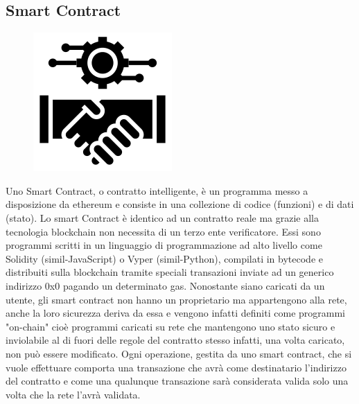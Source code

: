 \documentclass[11pt,a4paper,titlepage]{report}
\begin{document}
\subsection{Smart Contract}
\begin{figure}
	\includegraphics[height=0.2\textheight]{SmartC}
	\centering
\end{figure}

Uno Smart Contract, o contratto intelligente, è un programma messo a disposizione da ethereum e consiste in una collezione di codice (funzioni) e di dati (stato). Lo smart Contract è identico ad un contratto reale ma grazie alla tecnologia blockchain non necessita di un terzo ente verificatore. Essi sono programmi scritti in un linguaggio di programmazione ad alto livello come Solidity (simil-JavaScript) o Vyper (simil-Python), compilati in bytecode e distribuiti sulla blockchain tramite speciali transazioni inviate ad un generico indirizzo 0x0 pagando un determinato gas. Nonostante siano caricati da un utente, gli smart contract non hanno un proprietario ma appartengono alla rete, anche la loro sicurezza deriva da essa e vengono infatti definiti come programmi "on-chain" cioè programmi caricati su rete che mantengono uno stato sicuro e inviolabile al di fuori delle regole del contratto stesso infatti, una volta caricato, non può essere modificato. Ogni operazione, gestita da uno smart contract, che si vuole effettuare comporta una transazione che avrà come destinatario l'indirizzo del contratto e come una qualunque transazione sarà considerata valida solo una volta che la rete l'avrà validata.
\end{document}
